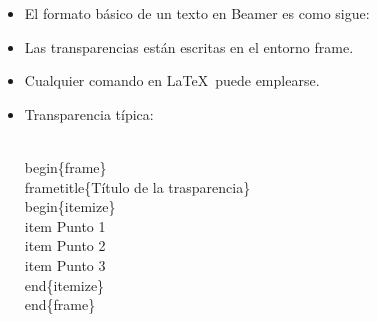 \documentclass[11pt]{beamer}
\begin{document}
\begin{frame}[fragile]

\begin{itemize}
\item El formato b\'asico de un texto en Beamer es como sigue:
\begin{block}{} \scriptsize
{}
\end{block}
\end{itemize}

\end{frame}
\normalsize



\begin{frame}[fragile]

\begin{itemize}[<+-| alert@+>]
\item Las transparencias est\'an escritas en el entorno \alert{frame}.
\item Cualquier comando en \LaTeX ~puede emplearse.

\item
Transparencia t\'ipica: \begin{block}{} \scriptsize
\begin{semiverbatim}
\\begin\{frame\}
\\frametitle\{T\'itulo de la trasparencia\}
\\begin\{itemize\}
\\item Punto 1
\\item Punto 2
\\item Punto 3
\\end\{itemize\}
\\end\{frame\}
\end{semiverbatim}
\end{block}
\end{itemize}

\end{frame}
\end{document}
